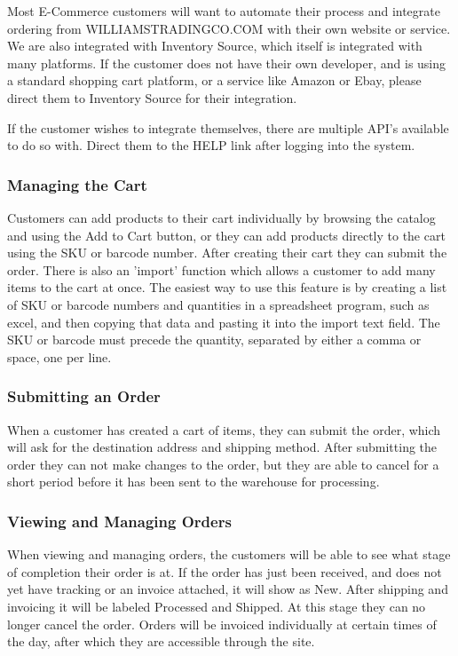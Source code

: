 Most E-Commerce customers will want to automate their process and integrate ordering from WILLIAMSTRADINGCO.COM with their own website or service.  We are also integrated with Inventory Source, which itself is integrated with many platforms.  If the customer does not have their own developer, and is using a standard shopping cart platform, or a service like Amazon or Ebay, please direct them to Inventory Source for their integration.

If the customer wishes to integrate themselves, there are multiple API's available to do so with.  Direct them to the HELP link after logging into the system.

\subsubsection{Managing the Cart}

Customers can add products to their cart individually by browsing the catalog and using the Add to Cart button, or they can add products directly to the cart using the SKU or barcode number.  After creating their cart they can submit the order. There is also an 'import' function which allows a customer to add many items to the cart at once.  The easiest way to use this feature is by creating a list of SKU or barcode numbers and quantities in a spreadsheet program, such as excel, and then copying that data and pasting it into the import text field.  The SKU or barcode must precede the quantity, separated by either a comma or space, one per line.

\subsubsection{Submitting an Order}

When a customer has created a cart of items, they can submit the order, which will ask for the destination address and shipping method.  After submitting the order they can not make changes to the order, but they are able to cancel for a short period before it has been sent to the warehouse for processing.

\subsubsection{Viewing and Managing Orders}

When viewing and managing orders, the customers will be able to see what stage of completion their order is at.  If the order has just been received, and does not yet have tracking or an invoice attached, it will show as New.  After shipping and invoicing it will be labeled Processed and Shipped.  At this stage they can no longer cancel the order.  Orders will be invoiced individually at certain times of the day, after which they are accessible through the site.

